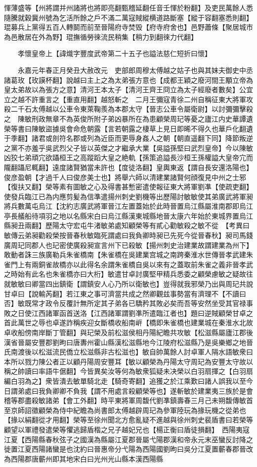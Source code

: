 惲薄盛等【州將謂并州諸將也將即亮翻甄稽延翻任音壬惲於粉翻】及吏民萬餘人悉隨騰就穀冀州號為乞活所餘之戶不滿二萬寇賊縱横道路斷塞【縱于容翻塞悉則翻】琨募兵上黨得五百人轉鬬而前至晉陽府寺焚毁【府寺府舍也】邑野蕭條【聚居城市為邑散居在外為野】琨撫循勞徠流民稍集【稍力到翻徠力代翻】

　　孝懷皇帝上【諱熾字豐度武帝第二十五子也謚法慈仁短折曰懷】

　　永嘉元年春正月癸丑大赦改元　吏部郎周穆太傅越之姑子也與其妹夫御史中丞諸葛玫【玫謨杯翻】說越曰主上之為太弟張方意也【成都王穎之廢河間王顒立帝為皇太弟故以為張方之意】清河王本太子【清河王齊王冏立為太子經廢者數矣】公宜立之越不許重言之【重直用翻】越怒斬之　二月王彌寇青徐二州自稱征東大將軍攻殺二千石太傅越以公車令東萊鞠羨為本郡太守【晉志公車令屬衛尉】以討彌彌擊殺之　陳敏刑政無章不為英俊所附子弟凶暴所在為患顧榮周玘等憂之廬江内史華譚遺榮等書曰陳敏盜據吳會命危朝露【言若朝露之棲草上見日即晞不得久也華戶化翻遺于季翻】諸君或剖符名郡或列為近臣而更辱身姦人之朝【朝直遥翻下同】降節叛逆之黨不亦羞乎吳武烈父子皆以英傑之才繼承大業【吳謚孫堅曰武烈皇帝】今以陳敏凶狡七弟頑宂欲躡桓王之高蹤蹈大皇之絶軌【孫策追謚長沙桓王孫權謚大皇帝宂而隴翻躡尼輒翻】遠度諸賢猶當未許也【度徒洛翻】皇輿東返【謂自長安還洛陽也】俊彦盈朝【才過千人曰俊彦美士也】將舉六師以清建業諸賢何顔復見中州之士邪【復扶又翻】榮等素有圖敏之心及得書甚慙密遣使報征東大將軍劉凖【使疏吏翻】使發兵臨江已為内應剪髪為信準遣揚州刺史劉機等出歷陽討敏敏使其弟廣武將軍昶將兵數萬屯烏江【沈約志廣武將軍晉江左置蓋始於此時晉置烏江縣屬淮南郡即烏江亭長艤船待項羽之地以名縣宋白曰烏江縣漢東城縣地晉太康六年始於東城界置烏江縣昶丑兩翻】歷陽太守宏屯牛渚敏弟處知顧榮等有貳心勸敏殺之敏不從　【考異曰敏傳云弟昶勸殺榮按晉春秋敏臨死謂處曰我負卿時昶已先死今從晉春秋】昶司馬錢廣周玘同郡人也玘密使廣殺昶宣言州下已殺敏【揚州刺史治建業故謂建業為州下】敢動者誅三族廣勒兵朱雀橋南【朱雀橋在吳建業宫城之南跨秦淮水世傳晉孝武建朱雀門上有兩銅雀故橋亦以此得名余謂朱雀橋自吳以來有之蓋取前朱雀之義非晉孝武之時始有此名也朱雀橋亦曰大桁】敏遣甘卓討廣堅甲精兵悉委之顧榮慮敏之疑故往就敏敏曰卿當四出鎮衛【謂鎮安人心乃所以衛敏也】豈得就我邪榮乃出與周玘共說甘卓曰【說輸芮翻】若江東之事可濟當共成之然卿觀兹事勢當有濟理不【不讀曰否】敏既常才政令反覆計無所定其子弟各已驕矜其敗必矣而吾等安然坐受其官禄事敗之日使江西諸軍函首送洛【江西諸軍謂劉凖所遣臨江者也】題曰逆賊顧榮甘卓之首此萬世之辱也卓遂詐稱疾迎女斷橋收船南㟁【橋即朱雀橋也建業城在秦淮水北故卓收船傍南岸斷丁管翻】與玘榮及前松滋侯相丹陽紀瞻共攻敏【松滋縣屬廬江郡後漢省晉屬安豐郡劉昫曰唐夀州霍山縣漢松滋縣地今江陵府松滋縣乃是吳樂鄉之地晉氏南渡後以松滋流民僑立松滋縣非古松滋也】敏自帥萬餘人討卓軍人隔水語敏衆曰本所以戮力陳公者正以顧丹陽周安豐耳【敏以顧榮為丹陽太守周玘為安豐太守故以稱之帥讀曰率語牛倨翻】今皆異矣汝等何為敏衆狐疑未决榮以白羽扇揮之【白羽扇編白羽為之】衆皆潰去敏單騎北走【騎奇寄翻】追獲之於江乘歎曰諸人誤我以至今日謂弟處曰我負卿卿不負我【謂不用處言殺顧榮等也】遂斬敏於建業夷三族於是會稽等郡盡殺敏諸弟【會工外翻】時平東將軍周馥代劉凖鎮壽春三月己未朔馥傳敏首至京師詔徵顧榮為侍中紀瞻為尚書郎太傅越辟周玘為參軍陸玩為掾玩機之從弟也【掾以絹翻從才用翻】榮等至徐州聞北方愈亂疑不進越與徐州刺史裴盾書曰若榮等顧望以軍禮發遣榮等懼逃歸盾楷之兄子越妃兄也【楊正衡曰盾徒損翻】　西陽夷寇江夏【西陽縣春秋弦子之國漢為縣屬江夏郡晉屬弋陽郡漢和帝永元末巫蠻反討降之徙置江夏西陽諸蠻是也沈約曰晉惠帝分弋陽為西陽國劉昫曰吳分江夏置蘄春郡晉改為西陽郡唐蘄州即其地宋白曰光州光山縣本漢西陽縣